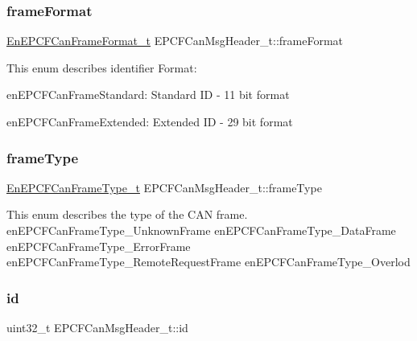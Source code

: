 \subsubsection{\texorpdfstring{frame\+Format}{frameFormat}}
{\footnotesize\ttfamily \mbox{\hyperlink{can_8h_a5edf07e1dd389b138138a38d7b513eb3}{En\+E\+P\+C\+F\+Can\+Frame\+Format\+\_\+t}} E\+P\+C\+F\+Can\+Msg\+Header\+\_\+t\+::frame\+Format}

This enum describes identifier Format\+:
\begin{DoxyItemize}
\item en\+E\+P\+C\+F\+Can\+Frame\+Standard\+: Standard ID -\/ 11 bit format
\item en\+E\+P\+C\+F\+Can\+Frame\+Extended\+: Extended ID -\/ 29 bit format 
\end{DoxyItemize}\mbox{\label{structEPCFCanMsgHeader__t_aa62b2d4a72a8c7251efc3b54296a5e38}} 
\subsubsection{\texorpdfstring{frame\+Type}{frameType}}
{\footnotesize\ttfamily \mbox{\hyperlink{can_8h_a3ba32a3cfd614cbd886a7c62b692defc}{En\+E\+P\+C\+F\+Can\+Frame\+Type\+\_\+t}} E\+P\+C\+F\+Can\+Msg\+Header\+\_\+t\+::frame\+Type}

This enum describes the type of the C\+AN frame. en\+E\+P\+C\+F\+Can\+Frame\+Type\+\_\+\+Unknown\+Frame en\+E\+P\+C\+F\+Can\+Frame\+Type\+\_\+\+Data\+Frame en\+E\+P\+C\+F\+Can\+Frame\+Type\+\_\+\+Error\+Frame en\+E\+P\+C\+F\+Can\+Frame\+Type\+\_\+\+Remote\+Request\+Frame en\+E\+P\+C\+F\+Can\+Frame\+Type\+\_\+\+Overlod \mbox{\label{structEPCFCanMsgHeader__t_ab65259bd2e786aa9842f0b2dc23b394b}} 
\subsubsection{\texorpdfstring{id}{id}}
{\footnotesize\ttfamily uint32\+\_\+t E\+P\+C\+F\+Can\+Msg\+Header\+\_\+t\+::id}

